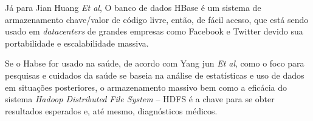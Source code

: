 Já para Jian Huang \textit{Et al}\cite{Huang-et-al-justifica}, O banco de dados HBase é um sistema de armazenamento chave/valor de código livre, então, de fácil acesso, que está sendo usado em \textit{datacenters} de grandes empresas como Facebook e Twitter devido sua portabilidade e escalabilidade massiva.  

Se o Habse for usado na saúde, de acordo com Yang jun \textit{Et al}\cite{Jim-etal-justifica}, como o foco para pesquisas e cuidados da saúde se baseia na análise de estatísticas e uso de dados em situações posteriores, o armazenamento massivo bem como a eficácia do sistema \textit{Hadoop Distributed File System} -- HDFS é a chave para se obter resultados esperados e, até mesmo, diagnósticos médicos.





